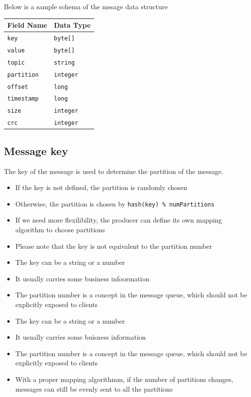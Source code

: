 \documentclass{report}
\theoremstyle{definition}
\let\oldsubsection\subsection
\renewcommand{\subsection}{\oldsubsection*}
\begin{document}
Below is a sample schema of the mssage data structure

\begin{tabular}{|p{6cm}|p{6cm}|}
\hline
\textbf{Field Name} & \textbf{Data Type} \\
\hline
\lstinline|key| & \lstinline|byte[]| \\
\hline
\lstinline|value| & \lstinline|byte[]| \\
\hline
\lstinline|topic| & \lstinline|string| \\
\hline
\lstinline|partition| & \lstinline|integer| \\
\hline
\lstinline|offset| & \lstinline|long| \\
\hline
\lstinline|timestamp| & \lstinline|long| \\
\hline
\lstinline|size| & \lstinline|integer| \\
\hline
\lstinline|crc| & \lstinline|integer| \\
\hline
\end{tabular}

\subsection{Message key}

The key of the message is used to determine the partition of the message.

\begin{itemize}
\item
If the key is not defined, the partition is randomly chosen
\item
Otherwise, the partition is chosen by \lstinline|hash(key) % numPartitions|
\item
If we need more flexilibility, the producer can define its own mapping algorithm to choose partitions
\item
Please note that the key is not equivalent to the partition number
\item
The key can be a string or a number
\item
It usually carries some business infoormation
\item
The partition number is a concept in the message queue, which should not be explicitly exposed to clients
\item
The key can be a string or a number
\item
It usually carries some buisness information
\item
The partition number is a concept in the message queue, which should not be explicitly exposed  to clients
\item
With a proper mapping algorithmm, if the number of partitions changes, messages can still be evenly sent to all the partitions
\end{itemize}
\end{document}
